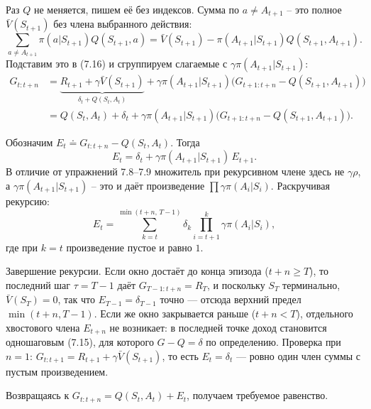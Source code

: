 \begin{solution}
    Раз $Q$ не меняется, пишем её без индексов. Сумма по $a\ne A_{t+1}$ -- это
    полное $\bar V(S_{t+1})$ без члена выбранного действия:
    \begin{equation*}
        \sum_{a\ne A_{t+1}}\pi(a|S_{t+1})Q(S_{t+1},a)
        = \bar V(S_{t+1}) - \pi(A_{t+1}|S_{t+1})Q(S_{t+1},A_{t+1}).
    \end{equation*}
    Подставим это в (7.16) и сгруппируем слагаемые с $\gamma\pi(A_{t+1}|S_{t+1})$:
    \begin{align*}
        G_{t:t+n} &= \underbrace{R_{t+1} + \gamma\bar V(S_{t+1})}_{\delta_t + Q(S_t,A_t)}
                     + \gamma\pi(A_{t+1}|S_{t+1})\bigl(G_{t+1:t+n} - Q(S_{t+1},A_{t+1})\bigr)\\
                  &= Q(S_t,A_t) + \delta_t
                     + \gamma\pi(A_{t+1}|S_{t+1})\bigl(G_{t+1:t+n} - Q(S_{t+1},A_{t+1})\bigr).
    \end{align*}

    Обозначим $E_t \doteq G_{t:t+n} - Q(S_t, A_t)$. Тогда
    \begin{equation*}
        E_t = \delta_t + \gamma\pi(A_{t+1}|S_{t+1})\,E_{t+1}.
    \end{equation*}
    В отличие от упражнений 7.8--7.9 множитель при рекурсивном члене здесь не
    $\gamma\rho$, а $\gamma\pi(A_{t+1}|S_{t+1})$ -- это и даёт произведение
    $\prod\gamma\pi(A_i|S_i)$. Раскручивая рекурсию:
    \begin{equation*}
        E_t = \sum_{k=t}^{\min(t+n,\,T-1)} \delta_k \prod_{i=t+1}^{k}\gamma\pi(A_i|S_i),
    \end{equation*}
    где при $k=t$ произведение пустое и равно $1$.

    Завершение рекурсии. Если окно достаёт до конца эпизода ($t+n\ge T$), то
    последний шаг $\tau=T-1$ даёт $G_{T-1:t+n} = R_T$, и поскольку $S_T$
    терминально, $\bar V(S_T)=0$, так что $E_{T-1}=\delta_{T-1}$ точно --- отсюда
    верхний предел $\min(t+n,T-1)$. Если же окно закрывается раньше ($t+n<T$),
    отдельного хвостового члена $E_{t+n}$ не возникает: в последней точке доход
    становится одношаговым (7.15), для которого $G-Q=\delta$ по определению.
    Проверка при $n=1$: $G_{t:t+1}=R_{t+1}+\gamma\bar V(S_{t+1})$, то есть
    $E_t=\delta_t$ --- ровно один член суммы с пустым произведением.

    Возвращаясь к $G_{t:t+n} = Q(S_t,A_t) + E_t$, получаем требуемое равенство.
\end{solution}
